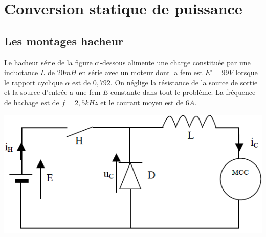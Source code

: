 \chapter{Conversion statique de puissance}
\thispagestyle{plain} %
\newpage


\section{Les montages hacheur}

Le hacheur série de la figure ci-dessous alimente une charge constituée par une inductance $L$ de $20mH$ en série avec un moteur dont la fem est $E’=99V$ lorsque le rapport cyclique $\alpha$ est de $0,792$. On néglige la résistance de la source de sortie et la source d’entrée a une fem $E$  constante dans tout le problème. La fréquence de hachage est de $f=2,5kHz$ et le courant moyen est de $6A$.
\begin{center}
\includegraphics[scale=0.5]{png/hacheur1.png}
\end{center}

